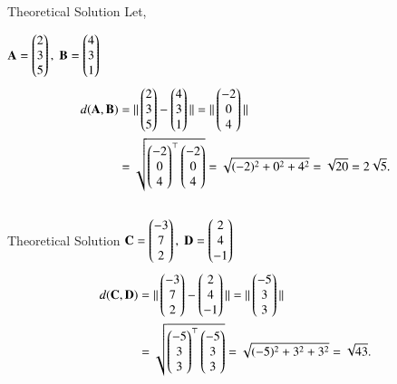 \documentclass{beamer}
\begin{document}
\begin{frame}{Theoretical Solution}
Let,

$\mathbf{A} = \begin{pmatrix}2\\3\\5\end{pmatrix}, \;\mathbf{B} = \begin{pmatrix}4\\3\\1\end{pmatrix}$
\begin{align*}
d(\mathbf{A},\mathbf{B}) &= \|\begin{pmatrix}2\\3\\5\end{pmatrix}-\begin{pmatrix}4\\3\\1\end{pmatrix}\|
= \|\begin{pmatrix}-2\\0\\4\end{pmatrix}\| \\
&= \sqrt{\begin{pmatrix}-2\\0\\4\end{pmatrix}^\top\begin{pmatrix}-2\\0\\4\end{pmatrix}} = \sqrt{(-2)^2+0^2+4^2} = \sqrt{20} = 2\sqrt{5}. \\[10pt]
\end{align*}


\end{frame}
\begin{frame}{Theoretical Solution}
$\mathbf{C} = \begin{pmatrix}-3\\7\\2\end{pmatrix}, \;\mathbf{D} = \begin{pmatrix}2\\4\\-1\end{pmatrix}$
\begin{align*}
d(\mathbf{C},\mathbf{D}) &= \|\begin{pmatrix}-3\\7\\2\end{pmatrix}-\begin{pmatrix}2\\4\\-1\end{pmatrix}\|
= \|\begin{pmatrix}-5\\3\\3\end{pmatrix}\|\\ 
&= \sqrt{\begin{pmatrix}-5\\3\\3\end{pmatrix}^\top\begin{pmatrix}-5\\3\\3\end{pmatrix}} = \sqrt{(-5)^2+3^2+3^2} = \sqrt{43}. \\[10pt]
\end{align*}
\end{frame}
\end{document}
